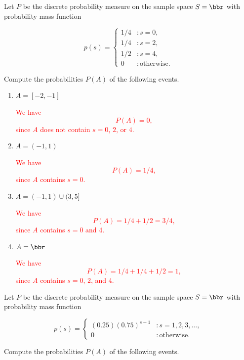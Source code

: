 \documentclass[12pt,reqno]{amsart}
\begin{document}
\bigskip
\prob Let $P$ be the discrete probability measure on the sample space $S=\bbr$ with probability mass function

    \[p(s) = \begin{cases}
    1/4 & : s=0, \\
    1/4 & : s=2, \\
    1/2 & : s=4, \\
    0 & : \text{otherwise}.
    \end{cases}\]

Compute the probabilities $P(A)$ of the following events.

\medskip
\begin{enumerate}
    \item $A = [-2, -1]$
    
    \bigskip
    \textcolor{red}{We have
            \[P(A) = 0,\]
    since $A$ does not contain $s=0$, $2$, or $4$.}
    \bigskip

    \item $A = (-1, 1)$
    
    \bigskip
    \textcolor{red}{We have
            \[P(A) = 1/4,\]
    since $A$ contains $s=0$.}
    \bigskip

    \item $A = (-1, 1) \cup (3,5]$
    
    \bigskip
    \textcolor{red}{We have
            \[P(A) = 1/4 + 1/2 = 3/4,\]
    since $A$ contains $s=0$ and $4$.}
    \bigskip
    
    \item $A = \bbr$
    
    \bigskip
    \textcolor{red}{We have
            \[P(A) = 1/4 +1/4+ 1/2 = 1,\]
    since $A$ contains $s=0$, $2$, and $4$.}
\end{enumerate}









\bigskip
\prob Let $P$ be the discrete probability measure on the sample space $S=\bbr$ with probability mass function

\[p(s) = \begin{cases}
    (0.25) (0.75)^{s-1} & : s=1, 2, 3, \ldots, \\
0 & : \text{otherwise}.
\end{cases}\]

Compute the probabilities $P(A)$ of the following events.
\end{document}
